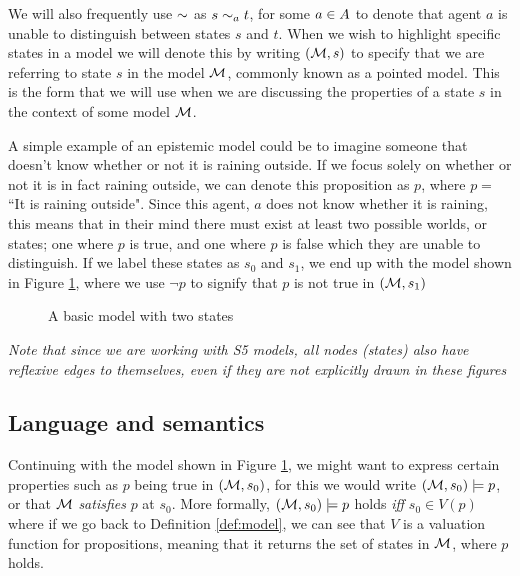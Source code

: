 We will also frequently use $\sim$ as $s\sim_a t$, for some $a\in A$ to denote that agent $a$ is unable to distinguish between states $s$ and $t$. When we wish to highlight specific states in a model we will denote this by writing $(\mathcal{M},s)$ to specify that we are referring to state $s$ in the model $\mathcal{M}$, commonly known as a pointed model. This is the form that we will use when we are discussing the properties of a state $s$ in the context of some model $\mathcal{M}$. 

A simple example of an epistemic model could be to imagine someone that doesn't know whether or not it is raining outside. If we focus solely on whether or not it is in fact raining outside, we can denote this proposition as $p$, where $p = $``It is raining outside". Since this agent, $a$ does not know whether it is raining, this means that in their mind there must exist at least two possible worlds, or states; one where $p$ is true, and one where $p$ is false which they are unable to distinguish. If we label these states as $s_0$ and $s_1$, we end up with the model shown in Figure \ref{fig:basicEM}, where we use $\neg p$ to signify that $p$ is not true in $(\mathcal{M},s_1)$

\begin{figure}[h]
	\centering
	\caption{A basic model with two states}
	\label{fig:basicEM}
\end{figure}

\textit{Note that since we are working with S5 models, all nodes (states) also have reflexive edges to themselves, even if they are not explicitly drawn in these figures}

\subsection{Language and semantics}

Continuing with the model shown in Figure \ref{fig:basicEM}, we might want to express certain properties such as $p$ being true in $(\mathcal{M},s_0)$, for this we would write $(\mathcal{M},s_0) \models p$, or that $\mathcal{M}$ \textit{satisfies} $p$ at $s_0$. More formally, $(\mathcal{M},s_0) \models p$ holds \textit{iff} $s_0 \in V(p)$ where if we go back to Definition \ref{def:model}, we can see that $V$ is a valuation function for propositions, meaning that it returns the set of states in $\mathcal{M}$, where $p$ holds. 

